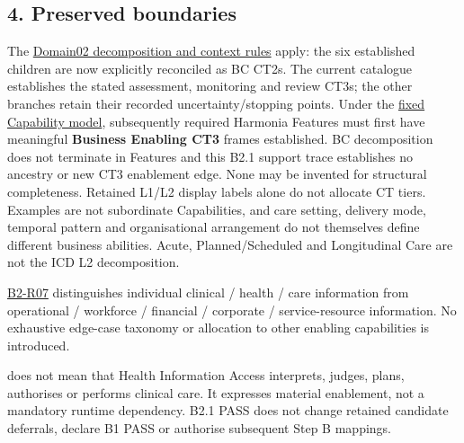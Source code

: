 \label{rad:b2-1:116}
\subsection*{4. Preserved boundaries}
\label{rad:b2-1:118}

The \hyperref[rad:business:71]{Domain02 decomposition and context rules} apply: the six established children are now explicitly reconciled as BC CT2s. The current catalogue establishes the stated assessment, monitoring and review CT3s; the other branches retain their recorded uncertainty/\allowbreak{}stopping points. Under the \hyperref[rad:metamodel:33]{fixed Capability model}, subsequently required Harmonia Features must first have meaningful \textbf{Business Enabling CT3} frames established. BC decomposition does not terminate in Features and this B2.1 support trace establishes no ancestry or new CT3 enablement edge. None may be invented for structural completeness. Retained L1/\allowbreak{}L2 display labels alone do not allocate CT tiers. Examples are not subordinate Capabilities, and care setting, delivery mode, temporal pattern and organisational arrangement do not themselves define different business abilities. Acute, Planned/\allowbreak{}Scheduled and Longitudinal Care are not the ICD L2 decomposition.

\label{rad:b2-1:133}

\href{https://github.com/fhirfactory/harmonia/blob/98410db60155198a75f74c79d98060070209faa1/docs/markdown/05-information-systems-architecture/traceability/step-b-method.md\#b2-r07}{B2-R07} distinguishes individual clinical /\allowbreak{} health /\allowbreak{} care information from operational /\allowbreak{} workforce /\allowbreak{} financial /\allowbreak{} corporate /\allowbreak{} service-resource information. No exhaustive edge-case taxonomy or allocation to other enabling capabilities is introduced.

\label{rad:b2-1:138}

\texttt{} does not mean that Health Information Access interprets, judges, plans, authorises or performs clinical care. It expresses material enablement, not a mandatory runtime dependency. B2.1 PASS does not change retained candidate deferrals, declare B1 PASS or authorise subsequent Step B mappings.


